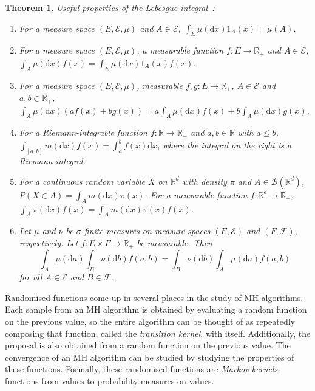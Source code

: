 \documentclass[english,twoside,openright]{HYgraduMLDS}
\newtheorem{theorem}[lemma]{Theorem}
\newcommand{\R}{\mathbb{R}}
\newcommand{\dx}{\mathrm{d}}
\begin{document}
\begin{theorem}\label{lebesgue_integral_theorem}
  Useful properties of the Lebesgue integral~\cite{Cin11}:
	\begin{enumerate}
    \item For a measure space \((E, \mathcal{E}, \mu)\) and
          \(A\in \mathcal{E}\), \(\int_{E}\mu(\dx x)1_{A}(x) = \mu(A)\).
    \item For a measure space \((E, \mathcal{E}, \mu)\),
          a measurable function \(f\colon E\to\R_{+}\) and \(A\in \mathcal{E}\),
          \(\int_{A}\mu(\dx x)f(x) = \int_{E}\mu(\dx x)1_{A}(x)f(x)\).
    \item For a measure space \((E, \mathcal{E}, \mu)\), measurable
          \(f, g\colon E\to \R_{+}\), \(A\in \mathcal{E}\) and \(a, b\in \R_{+}\),
          \(\int_{A} \mu(\dx x)(af(x) + bg(x))
          = a\int_{A} \mu(\dx x) f(x) + b\int_{A} \mu(\dx x) g(x)\).
    \item For a Riemann-integrable function \(f\colon \R\to \R_{+}\) and
          \(a, b\in \R\) with \(a \leq b\),
          \(\int_{[a, b]}m(\dx x)f(x) = \int_{a}^{b}f(x)\dx x\),
          where the integral on the right is a Riemann integral.
    \item For a continuous random variable \(X\) on \(\R^{d}\) with
          density \(\pi\) and \(A\in \mathcal{B}(\R^{d})\),
          \(P(X\in A) = \int_{A}m(\dx x)\pi(x)\). For a measurable
          function \(f\colon \R^{d}\to \R_{+}\),
          \(\int_{A}\pi(\dx x)f(x) = \int_{A}m(\dx x)\pi(x)f(x)\).
    \item Let \(\mu\) and \(\nu\) be \(\sigma\)-finite measures on
          measure spaces \((E, \mathcal{E})\) and \((F, \mathcal{F})\),
          respectively. Let \(f\colon E\times F\to \R_{+}\) be measurable.
          Then
          \[
          \int_{A}\mu(\dx a)\int_{B}\nu(\dx b)f(a, b)
          = \int_{B}\nu(\dx b)\int_{A}\mu(\dx a)f(a, b)
          \]
          for all \(A\in \mathcal{E}\) and \(B\in \mathcal{F}\).
  \end{enumerate}
\end{theorem}

Randomised functions come up in several places in the study of MH algorithms.
Each sample from an MH algorithm is obtained by evaluating a random function
on the previous value, so the entire algorithm can be thought of as repeatedly
composing that function, called the \emph{transition kernel}, with itself.
Additionally, the proposal is also obtained
from a random function on the previous value. The convergence of an MH
algorithm can be studied by studying the properties of these functions.
Formally, these randomised functions are \emph{Markov kernels},
functions from values to probability measures on values.
\end{document}
